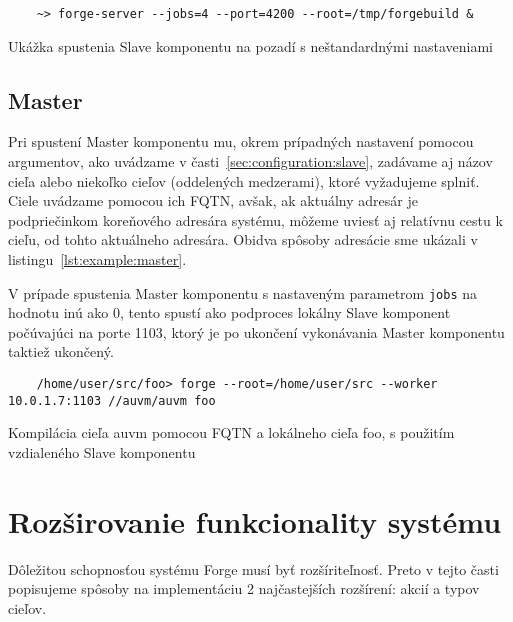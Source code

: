 \begin{listing}
  \begin{verbatim}
    ~> forge-server --jobs=4 --port=4200 --root=/tmp/forgebuild &
  \end{verbatim}
  \caption[Ukážka spustenia Slave komponentu]{Ukážka spustenia Slave komponentu na pozadí s neštandardnými nastaveniami}
  \label{lst:example:slave}
\end{listing}

\subsection{Master}
\label{sec:usage:client}

Pri spustení Master komponentu mu, okrem prípadných nastavení pomocou argumentov,
ako uvádzame v časti~\ref{sec:configuration:slave}, zadávame aj názov cieľa alebo
niekoľko cieľov (oddelených medzerami), ktoré vyžadujeme splniť. Ciele uvádzame
pomocou ich FQTN, avšak, ak aktuálny adresár je podpriečinkom koreňového
adresára systému, môžeme uviesť aj relatívnu cestu k cieľu, od tohto aktuálneho
adresára. Obidva spôsoby adresácie sme ukázali v listingu~\ref{lst:example:master}.

V prípade spustenia Master komponentu s nastaveným parametrom \texttt{jobs} na hodnotu
inú ako 0, tento spustí ako podproces lokálny Slave komponent počúvajúci na porte 1103,
ktorý je po ukončení vykonávania Master komponentu taktiež ukončený.

\begin{listing}
  \begin{verbatim}
    /home/user/src/foo> forge --root=/home/user/src --worker 10.0.1.7:1103 //auvm/auvm foo
  \end{verbatim}
  \caption[Ukážka kompilácie pomocou Forge]{Kompilácia cieľa auvm pomocou FQTN a lokálneho cieľa foo, s použitím vzdialeného Slave komponentu}
  \label{lst:example:master}
\end{listing}

\section{Roz\v{s}irovanie funkcionality syst\'{e}mu}
\label{sec:contributing}

Dôležitou schopnosťou systému Forge musí byť rozšíriteľnosť. Preto v tejto časti popisujeme
spôsoby na implementáciu 2 najčastejších rozšírení: akcií a typov cieľov.


